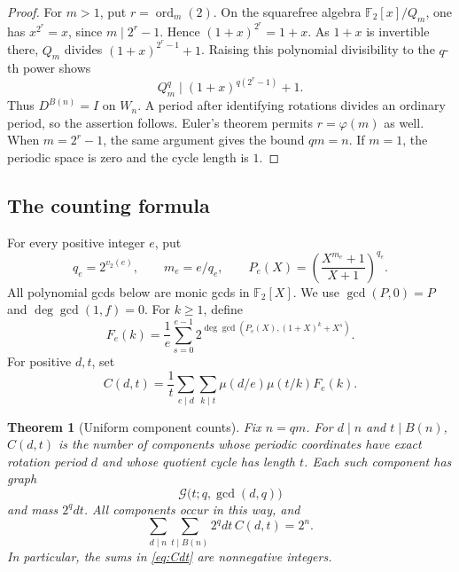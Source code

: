 \documentclass[11pt]{article}
\newtheorem{theorem}{Theorem}[section]
\theoremstyle{definition}
\theoremstyle{remark}
\numberwithin{equation}{section}
\newcommand{\F}{\mathbb F_2}
\newcommand{\G}{\mathcal G}
\DeclareMathOperator{\ord}{ord}
\begin{document}
\begin{proof}
For $m>1$, put $r=\ord_m(2)$. On the squarefree algebra
$\F[x]/Q_m$, one has $x^{2^r}=x$, since $m\mid2^r-1$.
Hence $(1+x)^{2^r}=1+x$. As $1+x$ is invertible there,
$Q_m$ divides $(1+x)^{2^r-1}+1$. Raising this polynomial divisibility
to the $q$-th power shows
\[
 Q_m^q\mid (1+x)^{q(2^r-1)}+1.
\]
Thus $D^{B(n)}=I$ on $W_n$. A period after identifying rotations divides
an ordinary period, so the assertion follows. Euler's theorem permits
$r=\varphi(m)$ as well. When $m=2^r-1$, the same argument gives the
bound $qm=n$. If $m=1$, the periodic space is zero and the cycle length
is $1$.
\end{proof}

\subsection{The counting formula}

For every positive integer $e$, put
\begin{equation}\label{eq:Pe}
 q_e=2^{v_2(e)},\qquad m_e=e/q_e,\qquad
 P_e(X)=\left(\frac{X^{m_e}+1}{X+1}\right)^{q_e}.
\end{equation}
All polynomial gcds below are monic gcds in $\F[X]$. We use
$\gcd(P,0)=P$ and $\deg\gcd(1,f)=0$. For $k\ge1$, define
\begin{equation}\label{eq:Fe}
 F_e(k)=\frac1e\sum_{s=0}^{e-1}
 2^{\deg\gcd\left(P_e(X),(1+X)^k+X^s\right)}.
\end{equation}
For positive $d,t$, set
\begin{equation}\label{eq:Cdt}
 C(d,t)=\frac1t\sum_{e\mid d}\sum_{k\mid t}
 \mu(d/e)\mu(t/k)F_e(k).
\end{equation}

\begin{theorem}[Uniform component counts]\label{thm:mobius}
Fix $n=qm$. For $d\mid n$ and $t\mid B(n)$, $C(d,t)$ is the number
of components whose periodic coordinates have exact rotation period $d$
and whose quotient cycle has length $t$. Each such component has graph
\begin{equation}\label{eq:mobius-graph}
 \G\bigl(t;q,\gcd(d,q)\bigr)
\end{equation}
and mass $2^qdt$. All components occur in this way, and
\begin{equation}\label{eq:mobius-total}
 \sum_{d\mid n}\sum_{t\mid B(n)}2^qdt\,C(d,t)=2^n.
\end{equation}
In particular, the sums in \eqref{eq:Cdt} are nonnegative integers.
\end{theorem}
\end{document}
